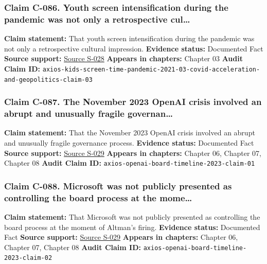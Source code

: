 \documentclass[
  american,
  11pt,
  letterpaper,
]{article}
\begin{document}
\subsubsection{Claim C-086. Youth screen intensification during the
pandemic was not only a retrospective
cul\ldots{}}\label{claim-c-086-youth-screen-intensification-during-the-pandemic-was-not-only-a-retrospective-cul}

\textbf{Claim statement:} That youth screen intensification during the
pandemic was not only a retrospective cultural impression.
\textbf{Evidence status:} Documented Fact \textbf{Source support:}
\hyperref[source-s-028-kids-screen-time-up-50-during-pandemic]{Source
S-028} \textbf{Appears in chapters:} Chapter 03 \textbf{Audit Claim ID:}
\texttt{axios-kids-screen-time-pandemic-2021-03-covid-acceleration-and-geopolitics-claim-03}

\subsubsection{Claim C-087. The November 2023 OpenAI crisis involved an
abrupt and unusually fragile
governan\ldots{}}\label{claim-c-087-the-november-2023-openai-crisis-involved-an-abrupt-and-unusually-fragile-governan}

\textbf{Claim statement:} That the November 2023 OpenAI crisis involved
an abrupt and unusually fragile governance process. \textbf{Evidence
status:} Documented Fact \textbf{Source support:}
\hyperref[source-s-029-how-sam-altman-s-ouster-went-down-according-to-openai-s-ex-president]{Source
S-029} \textbf{Appears in chapters:} Chapter 06, Chapter 07, Chapter 08
\textbf{Audit Claim ID:}
\texttt{axios-openai-board-timeline-2023-claim-01}

\subsubsection{Claim C-088. Microsoft was not publicly presented as
controlling the board process at the
mome\ldots{}}\label{claim-c-088-microsoft-was-not-publicly-presented-as-controlling-the-board-process-at-the-mome}

\textbf{Claim statement:} That Microsoft was not publicly presented as
controlling the board process at the moment of Altman's firing.
\textbf{Evidence status:} Documented Fact \textbf{Source support:}
\hyperref[source-s-029-how-sam-altman-s-ouster-went-down-according-to-openai-s-ex-president]{Source
S-029} \textbf{Appears in chapters:} Chapter 06, Chapter 07, Chapter 08
\textbf{Audit Claim ID:}
\texttt{axios-openai-board-timeline-2023-claim-02}
\end{document}
